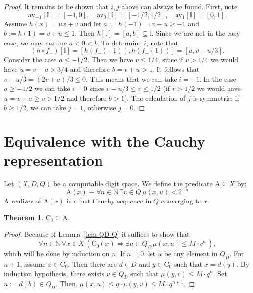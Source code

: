 \documentclass[microtype]{jloganal}
\theoremstyle{plain}
\newtheorem{theorem}{Theorem}[section]
\theoremstyle{definition}
\newcommand{\II}{\mathbb{I}}
\newcommand{\NN}{\mathbb{N}}
\newcommand{\av}[1]{\mathrm{av}_{#1}}
\newcommand{\coco}{\mathrm{C}}
\newcommand{\fminus}{f_{-}}
\newcommand{\cauchy}{\mathrm{A}}
\begin{document}
\begin{proof}
It remains to be shown that $i,j$ above can always be found. 
First, note 
\[\av{-1}[\II] = [-1,0],\quad \av{0}[\II] = [-1/2,1/2], \quad
\av{1}[\II] = [0,1].\]
Assume $h(x) = ux+v$ and let $a:= h(-1) = v-u \ge -1$ and 
$b := h(1) = v+u \le 1$. Then $h[\II]=[a,b]\subseteq \II$. 
Since we are not in the easy case, we may assume $a < 0 < b$. 
To determine $i$, note that
\[(h\circ\fminus)[\II] = [h(\fminus(-1)),h(\fminus(1))] = [a,v-u/3]. \]
Consider the case $a\le -1/2$. Then we have  $v \le 1/4$, since 
if $v > 1/4$ we would have $u = v - a > 3/4$ and therefore $b = v + u > 1$.
It follows that $v - u/3 = (2v + a)/3  \le 0$. This means that we can take
$i = -1$. 
In the case $a \ge -1/2$ we can take $i = 0$ since $v - u/3 \le v \le 1/2$
(if $v > 1/2$ we would have $u = v - a \ge v > 1/2$ and therefore $b > 1$).
The calculation of $j$ is symmetric: if $b\ge 1/2$, we can take $j=1$, 
otherwise $j = 0$.
\end{proof}

\section{Equivalence with the Cauchy representation}
\label{sec-equiv}

Let $(X,D,Q)$ be a computable digit space.
We define the predicate $\cauchy\subseteq X$ by:
\[ \cauchy(x) \equiv 
   \forall n\in\NN\,\exists u\in Q\,\mu(x,u) < 2^{-n} \]
A realizer of $\cauchy(x)$ is a fast Cauchy sequence in $Q$ converging to $x$.

\begin{theorem}
\label{thm-c-sub-a}
$\coco_0 \subseteq \cauchy$.
\end{theorem}
\begin{proof}
Because of Lemma~\ref{lem-QD-Q} it suffices to show that
\[
\forall n\in\NN\,\forall x\in X\,(\coco_0(x) \Rightarrow 
   \exists u\in Q_D\,\mu(x,u) \le M \cdot q^n \,),
   \]
which will be done by induction on $n$.
If $n=0$, let $u$ be any element in $Q_D$.
For $n+1$, assume $x\in\coco_0$. Then there are 
$d\in D$ and $y\in\coco_0$ such that $x=d(y)$. By induction hypothesis,
there exists $v\in Q_D$ such that $\mu(y,v)\le M\cdot q^{n}$. 
Set $u := d(b)\in Q_D$. Then, $\mu(x,u) \le q\cdot\mu(y,v) \le M\cdot q^{n+1}$. 
\end{proof}
  
\end{document}
